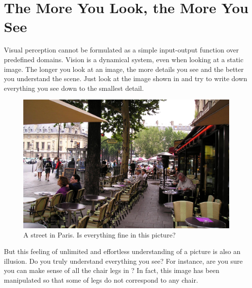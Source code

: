 \section{The More You Look, the More You See}
Visual perception cannot be formulated as a simple input-output function over predefined domains. Vision is a dynamical system, even when looking at a static image. The longer you look at an image, the more details you see and the better you understand the scene. Just look at the image shown in \fig{\ref{fig:street_in_paris}} and try to write down everything you see down to the smallest detail. 


\begin{figure}[t]
\centerline{
    \includegraphics[width=.98\linewidth]{figures/visionscience/ADE_train_00015819_messed_small.jpg}
    }
    \caption{A street in Paris. Is everything fine in this picture?}
    \label{fig:street_in_paris}
\end{figure}


But this feeling of unlimited and effortless understanding of a picture is also an illusion. Do you truly understand everything you see? For instance, are you sure you can make sense of all the chair legs in \fig{\ref{fig:street_in_paris}}? In fact, this image has been manipulated so that some of legs do not correspond to any chair.


